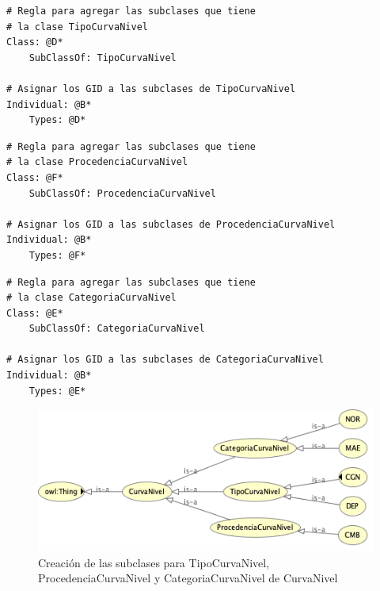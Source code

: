 
\begin{lstlisting}
# Regla para agregar las subclases que tiene 
# la clase TipoCurvaNivel 
Class: @D*
	SubClassOf: TipoCurvaNivel

# Asignar los GID a las subclases de TipoCurvaNivel
Individual: @B*
	Types: @D*
\end{lstlisting}




\begin{lstlisting}
# Regla para agregar las subclases que tiene 
# la clase ProcedenciaCurvaNivel 
Class: @F*
	SubClassOf: ProcedenciaCurvaNivel

# Asignar los GID a las subclases de ProcedenciaCurvaNivel
Individual: @B*
	Types: @F*
\end{lstlisting}





\begin{lstlisting}
# Regla para agregar las subclases que tiene 
# la clase CategoriaCurvaNivel 
Class: @E*
	SubClassOf: CategoriaCurvaNivel

# Asignar los GID a las subclases de CategoriaCurvaNivel
Individual: @B*
	Types: @E*
\end{lstlisting}


\begin{figure}[H]
	\centering
	\includegraphics[width=0.7\linewidth]{imagenes/capitulo5/tipos-curvasnivel}
	\caption{Creación de las subclases para TipoCurvaNivel, ProcedenciaCurvaNivel y CategoriaCurvaNivel de CurvaNivel}
	\label{fig:tipos-curvasnivel}
\end{figure}



